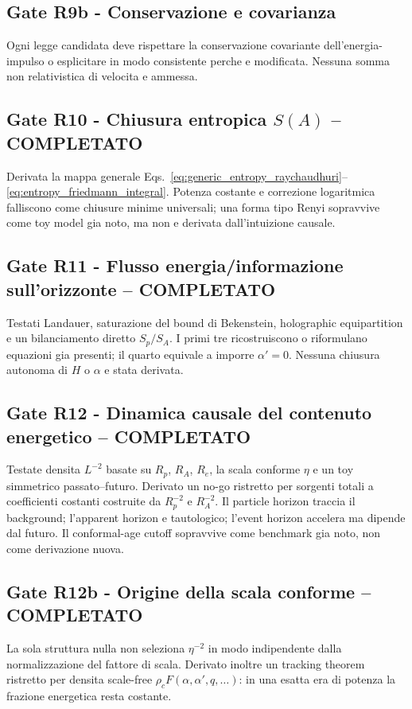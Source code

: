 \documentclass[11pt,a4paper]{article}
\begin{document}
\subsection*{Gate R9b - Conservazione e covarianza}
Ogni legge candidata deve rispettare la conservazione covariante dell'energia-impulso o esplicitare in modo consistente perche e modificata. Nessuna somma non relativistica di velocita e ammessa.

\subsection*{Gate R10 - Chiusura entropica $S(A)$ -- COMPLETATO}
Derivata la mappa generale Eqs.~\eqref{eq:generic_entropy_raychaudhuri}--\eqref{eq:entropy_friedmann_integral}. Potenza costante e correzione logaritmica falliscono come chiusure minime universali; una forma tipo Renyi sopravvive come toy model gia noto, ma non e derivata dall'intuizione causale.

\subsection*{Gate R11 - Flusso energia/informazione sull'orizzonte -- COMPLETATO}
Testati Landauer, saturazione del bound di Bekenstein, holographic equipartition e un bilanciamento diretto $S_p/S_A$. I primi tre ricostruiscono o riformulano equazioni gia presenti; il quarto equivale a imporre $\alpha'=0$. Nessuna chiusura autonoma di $H$ o $\alpha$ e stata derivata.

\subsection*{Gate R12 - Dinamica causale del contenuto energetico -- COMPLETATO}
Testate densita $L^{-2}$ basate su $R_p$, $R_A$, $R_e$, la scala conforme $\eta$ e un toy simmetrico passato--futuro. Derivato un no-go ristretto per sorgenti totali a coefficienti costanti costruite da $R_p^{-2}$ e $R_A^{-2}$. Il particle horizon traccia il background; l'apparent horizon e tautologico; l'event horizon accelera ma dipende dal futuro. Il conformal-age cutoff sopravvive come benchmark gia noto, non come derivazione nuova.

\subsection*{Gate R12b - Origine della scala conforme -- COMPLETATO}
La sola struttura nulla non seleziona $\eta^{-2}$ in modo indipendente dalla normalizzazione del fattore di scala. Derivato inoltre un tracking theorem ristretto per densita scale-free $\rho_cF(\alpha,\alpha',q,\ldots)$: in una esatta era di potenza la frazione energetica resta costante.
\end{document}
